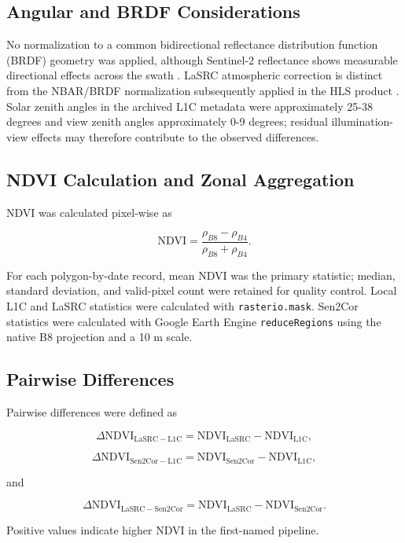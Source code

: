 \documentclass[
  authoryear,
  preprint]{elsarticle}
\begin{document}
\subsection{Angular and BRDF Considerations}\label{sec-angular}

No normalization to a common bidirectional reflectance distribution
function (BRDF) geometry was applied, although Sentinel-2 reflectance
shows measurable directional effects across the swath \citep{Roy2017}.
LaSRC atmospheric correction is distinct from the NBAR/BRDF
normalization subsequently applied in the HLS product
\citep{Franch2019, Ju2025HLS, USGSHLS2024}. Solar zenith angles in the
archived L1C metadata were approximately 25-38 degrees and view zenith
angles approximately 0-9 degrees; residual illumination-view effects may
therefore contribute to the observed differences.

\subsection{NDVI Calculation and Zonal
Aggregation}\label{sec-aggregation}

NDVI was calculated pixel-wise as

\[
\mathrm{NDVI}=\frac{\rho_{B8}-\rho_{B4}}{\rho_{B8}+\rho_{B4}}.
\]

For each polygon-by-date record, mean NDVI was the primary statistic;
median, standard deviation, and valid-pixel count were retained for
quality control. Local L1C and LaSRC statistics were calculated with
\texttt{rasterio.mask}. Sen2Cor statistics were calculated with Google
Earth Engine \texttt{reduceRegions} using the native B8 projection and a
10 m scale.

\subsection{Pairwise Differences}\label{sec-differences}

Pairwise differences were defined as

\[
\Delta\mathrm{NDVI}_{\mathrm{LaSRC-L1C}}=\mathrm{NDVI}_{\mathrm{LaSRC}}-\mathrm{NDVI}_{\mathrm{L1C}},
\]

\[
\Delta\mathrm{NDVI}_{\mathrm{Sen2Cor-L1C}}=\mathrm{NDVI}_{\mathrm{Sen2Cor}}-\mathrm{NDVI}_{\mathrm{L1C}},
\]

and

\[
\Delta\mathrm{NDVI}_{\mathrm{LaSRC-Sen2Cor}}=\mathrm{NDVI}_{\mathrm{LaSRC}}-\mathrm{NDVI}_{\mathrm{Sen2Cor}}.
\]

Positive values indicate higher NDVI in the first-named pipeline.
\end{document}
